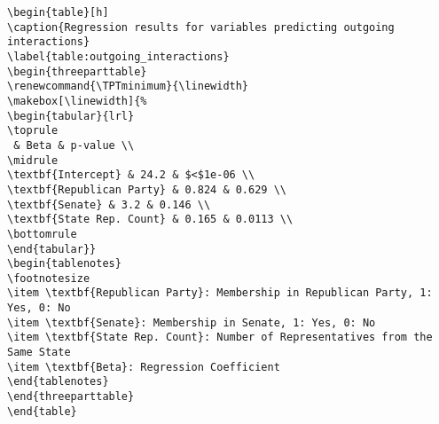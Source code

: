\documentclass[11pt]{article}
\begin{document}
\begin{Verbatim}[tabsize=4]
\begin{table}[h]
\caption{Regression results for variables predicting outgoing interactions}
\label{table:outgoing_interactions}
\begin{threeparttable}
\renewcommand{\TPTminimum}{\linewidth}
\makebox[\linewidth]{%
\begin{tabular}{lrl}
\toprule
 & Beta & p-value \\
\midrule
\textbf{Intercept} & 24.2 & $<$1e-06 \\
\textbf{Republican Party} & 0.824 & 0.629 \\
\textbf{Senate} & 3.2 & 0.146 \\
\textbf{State Rep. Count} & 0.165 & 0.0113 \\
\bottomrule
\end{tabular}}
\begin{tablenotes}
\footnotesize
\item \textbf{Republican Party}: Membership in Republican Party, 1: Yes, 0: No
\item \textbf{Senate}: Membership in Senate, 1: Yes, 0: No
\item \textbf{State Rep. Count}: Number of Representatives from the Same State
\item \textbf{Beta}: Regression Coefficient
\end{tablenotes}
\end{threeparttable}
\end{table}

\end{Verbatim}
\end{document}
